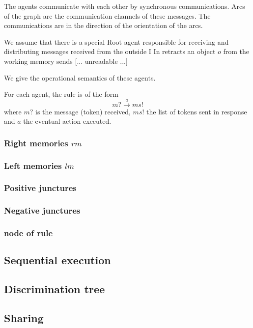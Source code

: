 The agents communicate with each other by synchronous communications. Arcs
of the graph are the communication channels of these messages. The communications
are in the direction of the orientation of the arcs.

We assume that there is a special Root agent responsible for receiving and distributing
messages received from the outside I In retracts an object $o$ from the working memory sends
[... unreadable ...]

We give the operational semantics of these agents.

For each agent, the rule is of the form
\begin{equation}
m? \stackrel{a}{\rightarrow} ms!
\end{equation}
where $m?$ is the message (token) received, $ms!$ the list of tokens sent in response and
$a$ the eventual action executed.

\subsubsection{Right memories $rm$}

\subsubsection{Left memories $lm$}

\subsubsection{Positive junctures}

\subsubsection{Negative junctures}

\subsubsection{node of rule}

\subsection{Sequential execution}

\subsection{Discrimination tree}

\subsection{Sharing}

